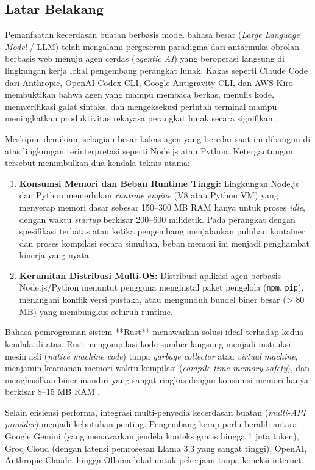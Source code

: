\subsection{Latar Belakang}
Pemanfaatan kecerdasan buatan berbasis model bahasa besar (\textit{Large Language Model} / LLM) telah mengalami pergeseran paradigma dari antarmuka obrolan berbasis web menuju agen cerdas (\textit{agentic AI}) yang beroperasi langsung di lingkungan kerja lokal pengembang perangkat lunak. Kakas seperti Claude Code dari Anthropic, OpenAI Codex CLI, Google Antigravity CLI, dan AWS Kiro membuktikan bahwa agen yang mampu membaca berkas, menulis kode, memverifikasi galat sintaks, dan mengeksekusi perintah terminal mampu meningkatkan produktivitas rekayasa perangkat lunak secara signifikan \cite{hou2024llm4se}.

Meskipun demikian, sebagian besar kakas agen yang beredar saat ini dibangun di atas lingkungan terinterpretasi seperti Node.js atau Python. Ketergantungan tersebut menimbulkan dua kendala teknis utama:
\begin{enumerate}
    \item \textbf{Konsumsi Memori dan Beban Runtime Tinggi:} Lingkungan Node.js dan Python memerlukan \textit{runtime engine} (V8 atau Python VM) yang menyerap memori dasar sebesar 150--300 MB RAM hanya untuk proses \textit{idle}, dengan waktu \textit{startup} berkisar 200--600 milidetik. Pada perangkat dengan spesifikasi terbatas atau ketika pengembang menjalankan puluhan kontainer dan proses kompilasi secara simultan, beban memori ini menjadi penghambat kinerja yang nyata \cite{pereira2021energy}.
    \item \textbf{Kerumitan Distribusi Multi-OS:} Distribusi aplikasi agen berbasis Node.js/Python menuntut pengguna menginstal paket pengelola (\texttt{npm}, \texttt{pip}), menangani konflik versi pustaka, atau mengunduh bundel biner besar (> 80 MB) yang membungkus seluruh runtime.
\end{enumerate}

Bahasa pemrograman sistem **Rust** menawarkan solusi ideal terhadap kedua kendala di atas. Rust mengompilasi kode sumber langsung menjadi instruksi mesin asli (\textit{native machine code}) tanpa \textit{garbage collector} atau \textit{virtual machine}, menjamin keamanan memori waktu-kompilasi (\textit{compile-time memory safety}), dan menghasilkan biner mandiri yang sangat ringkas dengan konsumsi memori hanya berkisar 8--15 MB RAM \cite{levy2020rust}.

Selain efisiensi performa, integrasi multi-penyedia kecerdasan buatan (\textit{multi-API provider}) menjadi kebutuhan penting. Pengembang kerap perlu beralih antara Google Gemini (yang menawarkan jendela konteks gratis hingga 1 juta token), Groq Cloud (dengan latensi pemrosesan Llama 3.3 yang sangat tinggi), OpenAI, Anthropic Claude, hingga Ollama lokal untuk pekerjaan tanpa koneksi internet.

